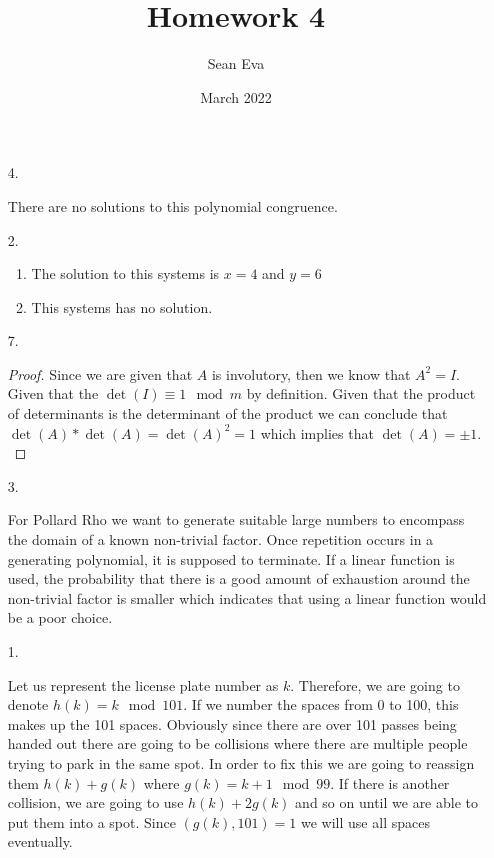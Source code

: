 \documentclass{article}
\title{Homework 4}
\author{Sean Eva}
\date{March 2022}
\theoremstyle{definition}
\begin{document}
\maketitle

\begin{enumerate}
    \item [4. ]
    
    There are no solutions to this polynomial congruence.
    
    \item [2. ]
    
    \begin{enumerate}
        \item 
        
        The solution to this systems is $x = 4$ and $y = 6$
        
        \item
        
        This systems has no solution.
        
    \end{enumerate}
    
    \item [7. ]
    
    \begin{proof}
    Since we are given that $A$ is involutory, then we know that $A^2 = I$. Given that the $\det(I) \equiv 1 \mod m$ by definition. Given that the product of determinants is the determinant of the product we can conclude that $\det(A) * \det(A) = \det(A)^2 = 1$ which implies that $\det(A) = \pm 1.$
    \end{proof}
    
    \item [3. ]
    
    For Pollard Rho we want to generate suitable large numbers to encompass the domain of a known non-trivial factor. Once repetition occurs in a generating polynomial, it is supposed to terminate. If a linear function is used, the probability that there is a good amount of exhaustion around the non-trivial factor is smaller which indicates that using a linear function would be a poor choice.
    
    \item [1. ]
    
    Let us represent the license plate number as $k$. Therefore, we are going to denote $h(k) = k\mod 101.$ If we number the spaces from 0 to 100, this makes up the 101 spaces. Obviously since there are over 101 passes being handed out there are going to be collisions where there are multiple people trying to park in the same spot. In order to fix this we are going to reassign them $h(k) + g(k)$ where $g(k) = k+1\mod 99.$ If there is another collision, we are going to use $h(k) + 2g(k)$ and so on until we are able to put them into a spot. Since $(g(k) , 101) = 1$ we will use all spaces eventually. 
    

\end{enumerate}
\end{document}
